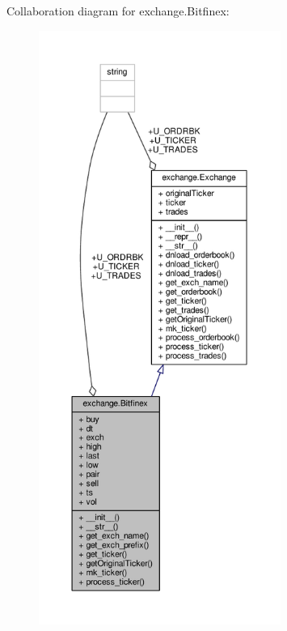 Collaboration diagram for exchange.\+Bitfinex\+:\nopagebreak
\begin{figure}[H]
\begin{center}
\leavevmode
\includegraphics[height=550pt]{classexchange_1_1_bitfinex__coll__graph}
\end{center}
\end{figure}
